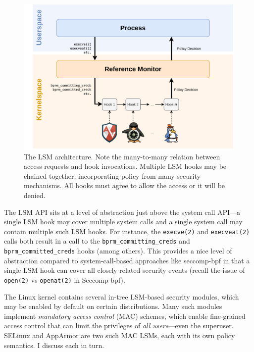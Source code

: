 \begin{figure}[htpb]
    \centering
    \includegraphics[width=0.8\linewidth]{figs/lsm.pdf}
    \caption{The LSM architecture. Note the many-to-many relation between access
    requests and hook invocations. Multiple LSM hooks may be chained together,
    incorporating policy from many security mechanisms. All hooks must agree to
    allow the access or it will be denied.}%
    \label{fig:lsm}
\end{figure}

The LSM API sits at a level of abstraction just above the system call API---a single LSM hook may cover multiple system calls and a single system call may contain multiple such LSM hooks. For instance, the \texttt{execve(2)} and \texttt{execveat(2)} calls both result in a call to the \texttt{bprm\_committing\_creds} and  \texttt{bprm\_committed\_creds} hooks (among others).  This provides a nice level of abstraction compared to system-call-based approaches like seccomp-bpf \cite{seccomp_bpf, drewry2012_seccomp_bpf} in that a single LSM hook can cover all closely related security events (recall the issue of \texttt{open(2)} vs \texttt{openat(2)} in Seccomp-bpf).

The Linux kernel contains several in-tree LSM-based security modules, which may be enabled by default on certain distributions.  Many such modules implement \textit{mandatory access control} (MAC) schemes, which enable fine-grained access control that can limit the privileges of \textit{all users}---even the superuser. SELinux \cite{smalley2001_selinux} and AppArmor \cite{cowan2000_apparmor} are two such MAC LSMs, each with its own policy semantics. I discuss each in turn.

